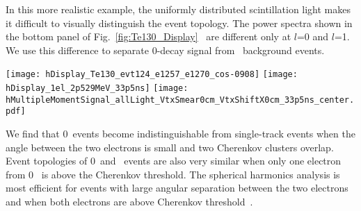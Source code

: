 In this more realistic example, the uniformly distributed
scintillation light makes it difficult to visually distinguish
the event topology. The power spectra shown in the bottom panel of
Fig.~\ref{fig:Te130_Display}~ are different only at $l$=0 and
$l$=1. We use this difference to separate 0\nbb-decay
signal from \B~background events.

\begin{figure*}[hb]
  \centering
  \texttt{[image: hDisplay\_Te130\_evt124\_e1257\_e1270\_cos-0908]}
  \texttt{[image: hDisplay\_1el\_2p529MeV\_33p5ns]}
  \texttt{[image: hMultipleMomentSignal\_allLight\_VtxSmear0cm\_VtxShiftX0cm\_33p5ns\_center.pdf]} 
  \caption{\emph{Top panels:} Event displays with multiple scattering
and at the center of the detector for: (\emph{top left}) a signal
event with two 1.26~MeV back-to-back electrons; and (\emph{top right
})a \B-neutrino background event with a single 2.53~MeV electron. The
model QEs are assumed for both Cherenkov photons (triangles) and
scintillation photons (dots).  \emph{Bottom panel:} The normalized
power spectrum $S_l$ for the Cherenkov photons, calculated
event-by-event for 1000 events of each of the two above topologies. The
heights of the rectangular boxes correspond to a 63\% C.L.
$(\pm 1 ~\sigma)$.}
\label{fig:Te130_Display}
\end{figure*}

We find that 0\nbb~events become indistinguishable from single-track events when
the angle between the two electrons is small and two Cherenkov
clusters overlap. Event topologies of 0\nbb~and \B~events are also
very similar when only one electron from 0\nbb~ is above the Cherenkov
threshold. The spherical harmonics analysis is most efficient
for events with large angular separation between the two electrons and
when both electrons are above Cherenkov threshold~\cite{further_cuts}.




